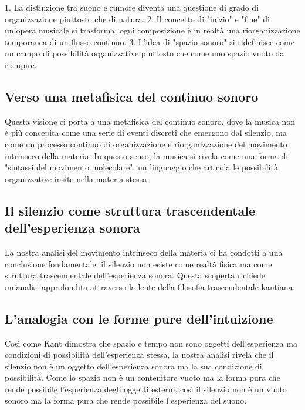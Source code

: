 \documentclass[a4paper,11pt]{article}
\begin{document}
1. La distinzione tra suono e rumore diventa una questione di grado di
organizzazione piuttosto che di natura. 2. Il concetto di "inizio" e
"fine" di un'opera musicale si trasforma: ogni composizione è in
realtà una riorganizzazione temporanea di un flusso continuo. 3. L'idea
di "spazio sonoro" si ridefinisce come un campo di possibilità
organizzative piuttosto che come uno spazio vuoto da riempire.

\subsection{Verso una metafisica del continuo sonoro}\hypertarget{verso-una-metafisica-del-continuo-sonoro}{}\label{verso-una-metafisica-del-continuo-sonoro}

Questa visione ci porta a una metafisica del continuo sonoro, dove la
musica non è più concepita come una serie di eventi discreti che
emergono dal silenzio, ma come un processo continuo di organizzazione e
riorganizzazione del movimento intrinseco della materia. In questo
senso, la musica si rivela come una forma di "sintassi del movimento
molecolare", un linguaggio che articola le possibilità organizzative
insite nella materia stessa.

\subsection{Il silenzio come struttura trascendentale dell'esperienza sonora}\hypertarget{il-silenzio-come-struttura-trascendentale-dellesperienza-sonora}{}\label{il-silenzio-come-struttura-trascendentale-dellesperienza-sonora}

La nostra analisi del movimento intrinseco della materia ci ha condotti
a una conclusione fondamentale: il silenzio non esiste come realtà
fisica ma come struttura trascendentale dell'esperienza sonora. Questa
scoperta richiede un'analisi approfondita attraverso la lente della
filosofia trascendentale kantiana.

\subsection{L'analogia con le forme pure dell'intuizione}\hypertarget{lanalogia-con-le-forme-pure-dellintuizione}{}\label{lanalogia-con-le-forme-pure-dellintuizione}

Così come Kant dimostra che spazio e tempo non sono oggetti
dell'esperienza ma condizioni di possibilità dell'esperienza stessa, la
nostra analisi rivela che il silenzio non è un oggetto dell'esperienza
sonora ma la sua condizione di possibilità. Come lo spazio non è un
contenitore vuoto ma la forma pura che rende possibile l'esperienza
degli oggetti esterni, così il silenzio non è un vuoto sonoro ma la
forma pura che rende possibile l'esperienza del suono.
\end{document}
